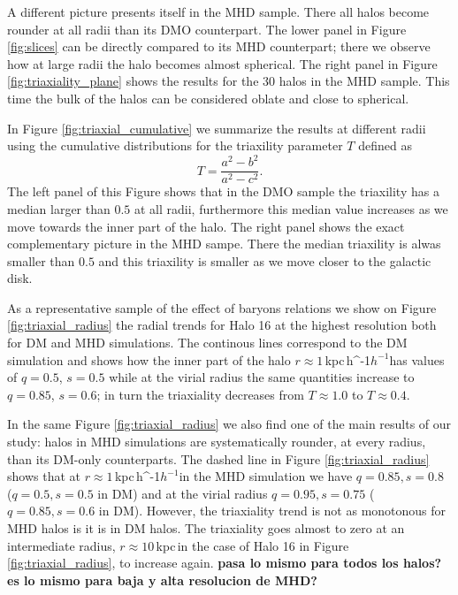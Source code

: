 \documentclass[a4paper,fleqn,usenatbib]{mnras}
\newcommand{\kpch}{\,{\rm kpc}\,\ifmmode h^{-1}\else $h^{-1}$\fi}
\newcommand{\kpc}{\,{\rm kpc}\,}
\begin{document}
A different picture presents itself in the MHD sample.
There all halos become rounder at all radii than its DMO
counterpart.
The lower panel in Figure \ref{fig:slices} can be directly compared to
its MHD counterpart; there we observe how at large radii the halo
becomes almost spherical. 
The right panel in Figure \ref{fig:triaxiality_plane} shows the
results for the 30 halos in the MHD sample.
This time the bulk of the halos can be considered oblate and close to
spherical. 

In Figure \ref{fig:triaxial_cumulative} we summarize the results at
different radii using the cumulative distributions for the 
triaxility parameter $T$ defined as 
\begin{equation}
T=\frac{a^2-b^2}{a^2-c^2}.
\label{eq:triaxiality}
\end{equation}
The left panel of this Figure shows that in the DMO sample the
triaxility has a median larger than $0.5$ at all radii, furthermore
this median value increases as we move towards the inner part of the
halo.
The right panel shows the exact complementary picture in the MHD
sampe.
There the median triaxility is alwas smaller than $0.5$ and this
triaxility is smaller as we move closer to the galactic disk.


As a representative sample of the effect of baryons relations we show on Figure
\ref{fig:triaxial_radius} the radial trends for Halo 16 at
the highest resolution both for DM and MHD simulations.
The continous lines correspond to the DM simulation and shows how
the inner part of the halo $r\approx 1$\kpch has values of 
$q=0.5$, $s=0.5$ while at the virial radius the same
quantities increase to $q=0.85$, $s=0.6$; in turn the triaxiality
decreases from $T\approx 1.0$ to $T\approx0.4$. 

In the same Figure \ref{fig:triaxial_radius} we also find one of the
main results of our study: halos in MHD simulations are systematically rounder, at
every radius, than its DM-only counterparts.  
The dashed line in Figure \ref{fig:triaxial_radius} shows that at
$r\approx 1$\kpch  in the MHD simulation we have $q=0.85, s=0.8$
($q=0.5, s=0.5$ in DM) and at the virial radius $q=0.95, s=0.75$
($q=0.85, s=0.6$ in DM).  
However, the triaxiality trend is not as monotonous for MHD halos is
it is in DM halos. 
The triaxiality goes almost to zero at an intermediate radius,
$r\approx 10$\kpc in the case of Halo 16 in Figure
\ref{fig:triaxial_radius}, to increase again. {\bf pasa lo mismo para
  todos los halos? es lo mismo para baja y alta resolucion de MHD?}
    
\end{document}
